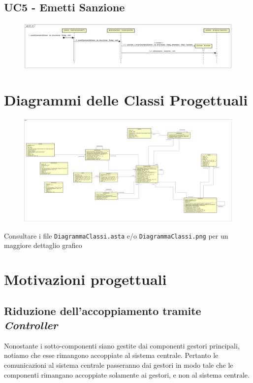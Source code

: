 \documentclass[12pt, letterpaper]{article}
\begin{document}
\subsection{UC5 - Emetti Sanzione}
\begin{figure}[H]
    \centering
    \includegraphics[scale=0.20]{UC5-ID}
\end{figure} 

\section{Diagrammi delle Classi Progettuali}
\begin{figure}[H]
    \centering
    \includegraphics[scale=0.10]{DiagrammaClassi}
\end{figure} 

\noindent
Consultare i file \texttt{DiagrammaClassi.asta} e/o 
\texttt{DiagrammaClassi.png} per un maggiore dettaglio 
grafico

\section{Motivazioni progettuali}

\subsection{Riduzione dell'accoppiamento 
tramite \emph{Controller}}
Nonostante i sotto-componenti siano gestite dai
componenti gestori principali, notiamo che esse rimangono 
accoppiate al sistema centrale.
Pertanto le comunicazioni al sistema centrale passeranno
dai gestori in modo tale che le componenti rimangano 
accoppiate solamente ai gestori, e non al sistema centrale.
\end{document}
